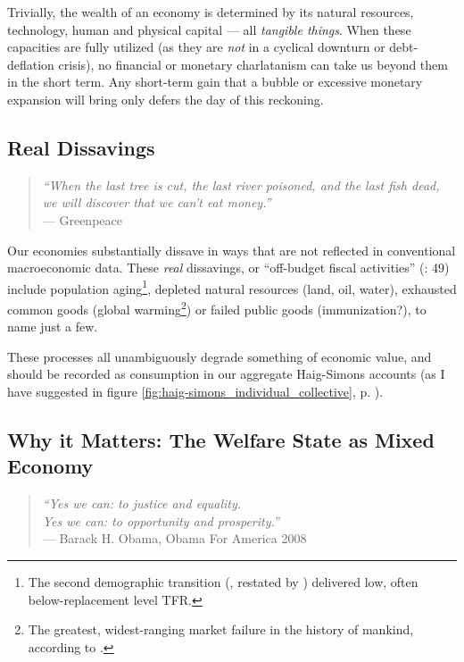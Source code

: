 Trivially, the wealth of an economy is determined by its natural resources, technology, human and physical capital --- all \emph{tangible things}. When these capacities are fully utilized (as they are \emph{not} in a cyclical downturn or debt-deflation crisis), no financial or monetary charlatanism can take us beyond them in the short term. Any short-term gain that a bubble or excessive monetary expansion will bring only defers the day of this reckoning.

\subsection{Real Dissavings} \label{sec:real_dissavings}

\begin{quote}
	\emph{``When the last tree is cut, the last river poisoned, and the last fish dead, we will discover that we can't eat money.''\\}
	--- Greenpeace
\end{quote}

Our economies substantially dissave in ways that are not reflected in conventional macroeconomic data. These \emph{real} dissavings, or ``off-budget fiscal activities'' (\citealt{Bonker2006}: 49) include population aging\footnote{
	The second demographic transition (\citealt{Davis1945}, restated by \citealt{Caldwell-1976-aa}) delivered low, often below-replacement level \gls{TFR}.}, 
depleted natural resources (land, oil, water), exhausted common goods (global warming\footnote{
	The greatest, widest-ranging market failure in the history of mankind, according to \cite{Stern-2006-aa}.}) 
or failed public goods (immunization?), to name just a few. 

These processes all unambiguously degrade something of economic value, and should be recorded as consumption in our aggregate Haig-Simons accounts (as I have suggested in figure \ref{fig:haig-simons_individual_collective}, p. \pageref{fig:haig-simons_individual_collective}). %

\subsection[Why it Matters]{Why it Matters: The Welfare State as Mixed Economy} \label{sec:why_mixed_economy_matters}

\begin{quote}
	\emph{``Yes we can: to justice and equality.\\ Yes we can: to opportunity and prosperity.''\\}
	--- Barack H. Obama, Obama For America 2008
\end{quote} %

